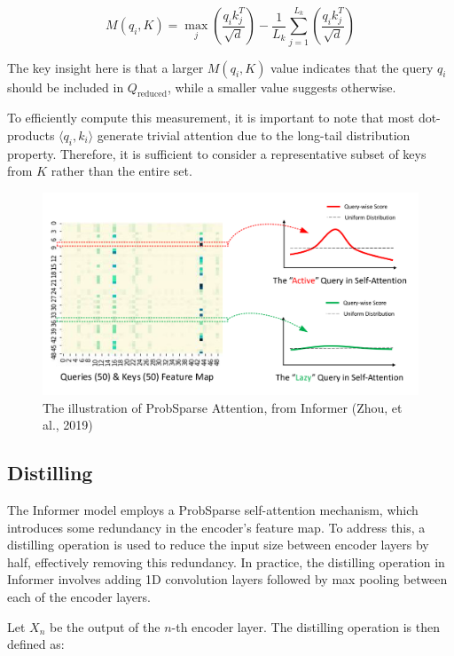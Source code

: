 \begin{equation}
M(q_i, K) = \max_j \left( \frac{q_i k_j^T}{\sqrt{d}} \right) - \frac{1}{L_k} \sum_{j=1}^{L_k} \left( \frac{q_i k_j^T}{\sqrt{d}} \right)
\end{equation}

The key insight here is that a larger \( M(q_i, K) \) value indicates that the query \( q_i \) should be included in \( Q_{\text{reduced}} \), while a smaller value suggests otherwise.

To efficiently compute this measurement, it is important to note that most dot-products \( \langle q_i, k_i \rangle \) generate trivial attention due to the long-tail distribution property. Therefore, it is sufficient to consider a representative subset of keys from \( K \) rather than the entire set.

\begin{figure}[htbp]
    \centering
    \includegraphics[width=12cm]{3_ChapterTranformerVariants/figuras/Queries_ProbSparceAttention.png}
    \caption{The illustration of ProbSparse Attention, from Informer (Zhou, et al., 2019)\cite{zhou2021informerefficienttransformerlong}}
    \end{figure}

\subsection{Distilling}
The Informer model employs a ProbSparse self-attention mechanism, which introduces some redundancy in the encoder’s feature map. To address this, a distilling operation is used to reduce the input size between encoder layers by half, effectively removing this redundancy. In practice, the distilling operation in Informer involves adding 1D convolution layers followed by max pooling between each of the encoder layers.

Let \( X_n \) be the output of the \( n \)-th encoder layer. The distilling operation is then defined as:

